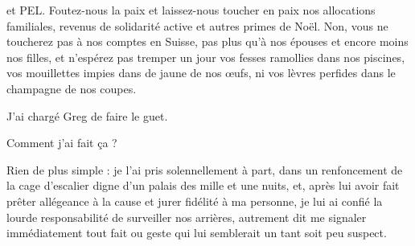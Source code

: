 et PEL. Foutez-nous la paix et laissez-nous toucher en paix nos allocations familiales, revenus de solidarité active et autres primes de Noël. Non, vous ne toucherez pas à nos comptes en Suisse, pas plus qu’à nos épouses et encore moins nos filles, et n’espérez pas tremper un jour vos fesses ramollies dans nos piscines, vos mouillettes impies dans de jaune de nos œufs, ni vos lèvres perfides dans le champagne de nos coupes.

J’ai chargé Greg de faire le guet.

Comment j’ai fait ça ?

Rien de plus simple : je l’ai pris solennellement à part, dans un renfoncement de la cage d’escalier digne d’un palais des mille et une nuits, et, après lui avoir fait prêter allégeance à la cause et jurer fidélité à ma personne, je lui ai confié la lourde responsabilité de surveiller nos arrières, autrement dit me signaler immédiatement tout fait ou geste qui lui semblerait un tant soit peu suspect.

